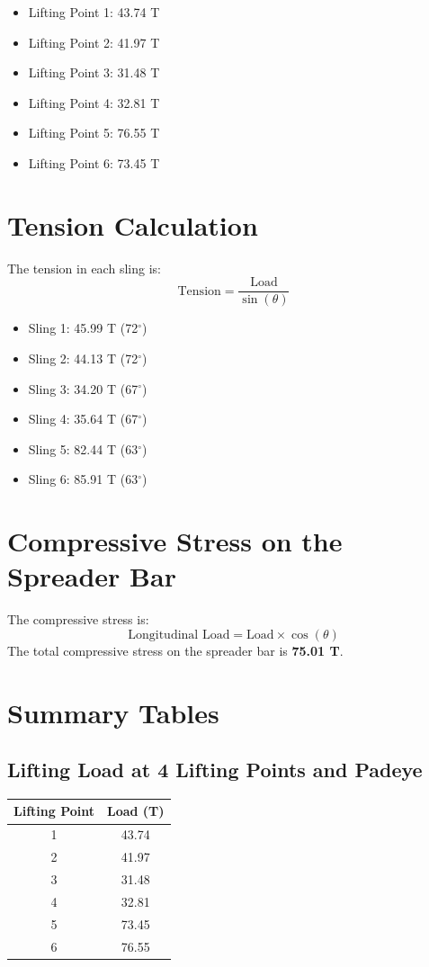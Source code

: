 \documentclass[12pt]{article}
\begin{document}
\begin{itemize}
  \item Lifting Point 1: 43.74 T
  \item Lifting Point 2: 41.97 T
  \item Lifting Point 3: 31.48 T
  \item Lifting Point 4: 32.81 T
  \item Lifting Point 5: 76.55 T
  \item Lifting Point 6: 73.45 T
\end{itemize}

\section{Tension Calculation}
The tension in each sling is:
\[
\text{Tension} = \frac{\text{Load}}{\sin(\theta)}
\]
\begin{itemize}
  \item Sling 1: 45.99 T (72$^\circ$)
  \item Sling 2: 44.13 T (72$^\circ$)
  \item Sling 3: 34.20 T (67$^\circ$)
  \item Sling 4: 35.64 T (67$^\circ$)
  \item Sling 5: 82.44 T (63$^\circ$)
  \item Sling 6: 85.91 T (63$^\circ$)
\end{itemize}

\section{Compressive Stress on the Spreader Bar}
The compressive stress is:
\[
\text{Longitudinal Load} = \text{Load} \times \cos(\theta)
\]
The total compressive stress on the spreader bar is \textbf{75.01 T}.

\section{Summary Tables}
\subsection*{Lifting Load at 4 Lifting Points and Padeye}
\begin{center}
\begin{tabular}{|c|c|}
\hline
Lifting Point & Load (T) \\
\hline
1 & 43.74 \\
2 & 41.97 \\
3 & 31.48 \\
4 & 32.81 \\
5 & 73.45 \\
6 & 76.55 \\
\hline
\end{tabular}
\end{center}
\end{document}
